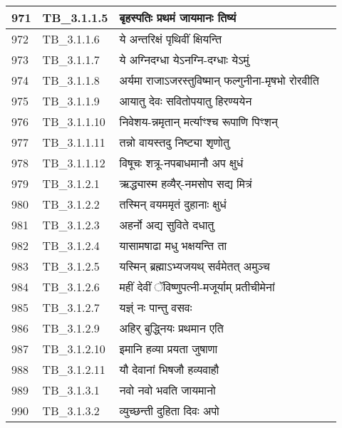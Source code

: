 \documentclass[17pt]{extarticle}
\begin{document}
\begin{longtable}{||p{0.4in}||p{0.9in}||p{4.0in}||p{0.9in}||}
        \hline
            971 & TB\_3.1.1.5 & बृहस्पतिः प्रथमं जायमानः तिष्यं &      \\
        \hline
            972 & TB\_3.1.1.6 & ये अन्तरिक्षं पृथिवीं क्षियन्ति &      \\
        \hline
            973 & TB\_3.1.1.7 & ये अग्निदग्धा येऽनग्नि{-}दग्धाः येऽमुं &      \\
        \hline
            974 & TB\_3.1.1.8 & अर्यमा राजाऽजरस्तुविष्मान् फल्गुनीना{-}मृषभो रोरवीति &      \\
        \hline
            975 & TB\_3.1.1.9 & आयातु देवः सवितोपयातु हिरण्ययेन &      \\
        \hline
            976 & TB\_3.1.1.10 & निवेशय{-}न्नमृतान् मर्त्याꣳश्च रूपाणि पिꣳशन् &      \\
        \hline
            977 & TB\_3.1.1.11 & तन्नो वायस्तदु निष्ट्या शृणोतु &      \\
        \hline
            978 & TB\_3.1.1.12 & विषूचः शत्रू{-}नपबाधमानौ अप क्षुधं &      \\
        \hline
            979 & TB\_3.1.2.1 & ऋद्ध्यास्म हव्यैर्{-}नमसोप सद्य मित्रं &      \\
        \hline
            980 & TB\_3.1.2.2 & तस्मिन् वयममृतं दुहानाः क्षुधं &      \\
        \hline
            981 & TB\_3.1.2.3 & अहर्नो अद्य सुविते दधातु &      \\
        \hline
            982 & TB\_3.1.2.4 & यासामषाढा मधु भक्षयन्ति ता &      \\
        \hline
            983 & TB\_3.1.2.5 & यस्मिन् ब्रह्माऽभ्यजयथ् सर्वमेतत् अमुञ्च &      \\
        \hline
            984 & TB\_3.1.2.6 & महीं देवीं ॅविष्णुपत्नी{-}मजूर्याम् प्रतीचीमेनां &      \\
        \hline
            985 & TB\_3.1.2.7 & यज्ञ्ं नः पान्तु वसवः &      \\
        \hline
            986 & TB\_3.1.2.9 & अहिर् बुद्ध्नियः प्रथमान एति &      \\
        \hline
            987 & TB\_3.1.2.10 & इमानि हव्या प्रयता जुषाणा &      \\
        \hline
            988 & TB\_3.1.2.11 & यौ देवानां भिषजौ हव्यवाहौ &      \\
        \hline
            989 & TB\_3.1.3.1 & नवो नवो भवति जायमानो &      \\
        \hline
            990 & TB\_3.1.3.2 & व्युच्छन्ती दुहिता दिवः अपो &      \\

\end{longtable}
\end{document}
